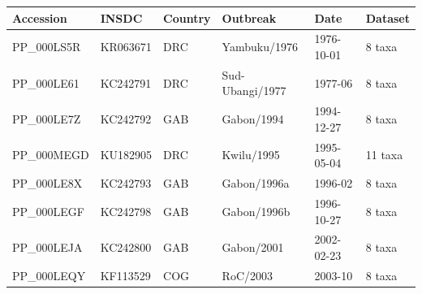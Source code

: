 
\begin{tabular}{llllll}
\toprule
Accession & INSDC & Country & Outbreak & Date & Dataset \\%
\toprule
PP\_000LS5R & KR063671 & DRC & Yambuku/1976 & 1976-10-01 & 8 taxa \\%
PP\_000LE61 & KC242791 & DRC & Sud-Ubangi/1977 & 1977-06 & 8 taxa \\%
PP\_000LE7Z & KC242792 & GAB & Gabon/1994 & 1994-12-27 & 8 taxa \\%
PP\_000MEGD & KU182905 & DRC & Kwilu/1995 & 1995-05-04 & 11 taxa \\%
PP\_000LE8X & KC242793 & GAB & Gabon/1996a & 1996-02 & 8 taxa \\%
PP\_000LEGF & KC242798 & GAB & Gabon/1996b & 1996-10-27 & 8 taxa \\%
PP\_000LEJA & KC242800 & GAB & Gabon/2001 & 2002-02-23 & 8 taxa \\%
PP\_000LEQY & KF113529 & COG & RoC/2003 & 2003-10 & 8 taxa \\%

\end{tabular}
